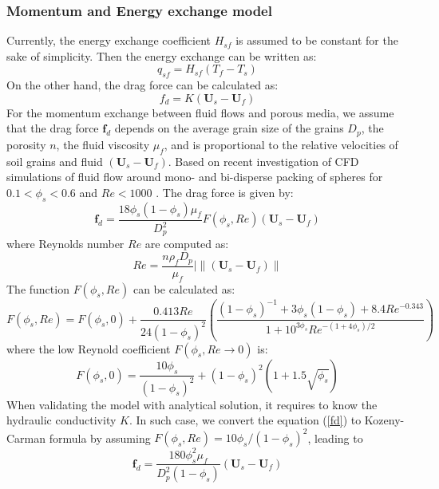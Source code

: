 \documentclass[preprint,12pt]{elsarticle}
\begin{document}
\subsubsection{Momentum and Energy exchange model}
Currently, the energy exchange coefficient $H_{sf}$ is assumed to be constant for the sake of simplicity. Then the energy exchange can be written as:
%
%
\begin{equation}
     q_{sf} = H_{sf} (T_f -T_s)
\end {equation}
%
%
On the other hand, the drag force can be calculated as:
%
%
\begin{equation}
    f_{d} = K (\pmb{U}_s - \pmb{U}_f)  
\end {equation}
%
%
For the momentum exchange between fluid flows and porous media, we assume that the drag force $\pmb{f}_{d}$ depends on the average grain size of the grains $D_p$, the porosity $n$, the fluid viscosity $\mu_f$, and is proportional to the relative velocities of soil grains and fluid $(\pmb{U}_s - \pmb{U}_f)$. Based on recent investigation of CFD simulations of fluid flow around mono- and bi-disperse packing of spheres for $0.1 < \phi_s < 0.6$ and $Re < 1000$ \cite{Drag}. The drag force is given by: \\
%
%
\begin{equation}
     \pmb{f}_{d} = \frac{18\phi_s(1-\phi_s)\mu_f}{D_p^2} F(\phi_s, Re) (\pmb{U}_s - \pmb{U}_f)  
\label{fd}
\end {equation}
%
%
where Reynolds number $Re$ are computed as:
%
%
\begin{equation}
     Re = \frac{n \rho_f D_p}{\mu_f} |\big\|(\pmb{U}_s - \pmb{U}_f)\big\|
\end {equation}
%
%
The function $F(\phi_s, Re)$ can be calculated as:
%
%
\begin{equation}
     F(\phi_s, Re)  = F(\phi_s, 0)  + \frac{0.413Re}{24 (1-\phi_s)^2} (\frac{(1-\phi_s)^{-1}+3\phi_s(1-\phi_s)+8.4Re^{-0.343}}{1+10^{3\phi_s}Re^{-(1+4\phi_s)/2}})
\end {equation}
%
%
where the low Reynold coefficient $ F(\phi_s, Re\rightarrow0)$ is:
%
%
\begin{equation}
     F(\phi_s, 0)  = \frac{10\phi_s}{ (1-\phi_s)^2}+(1-\phi_s)^2(1+1.5\sqrt{\phi_s})
\end {equation}
%
%
When validating the model with analytical solution, it requires to know the hydraulic conductivity $K$. In such case, we convert the equation (\ref{fd}) to Kozeny-Carman formula by assuming $F(\phi_s, Re) = 10\phi_s/(1-\phi_s)^2$, leading to 
%
%
\begin{equation}
     \pmb{f}_{d} = \frac{180 \phi_s^2\mu_f}{D_p^2 (1-\phi_s)} (\pmb{U}_s - \pmb{U}_f)  
\label{fd}
\end {equation}
\end{document}
